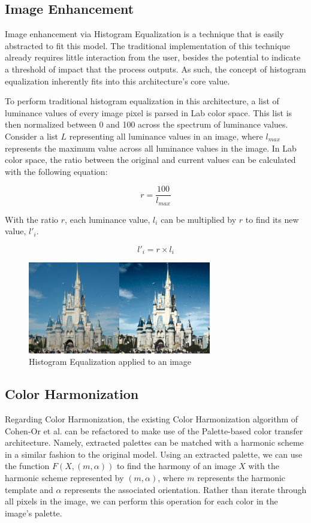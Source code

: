 \documentclass[sigchi]{acmart}
\begin{document}
\subsection{Image Enhancement}

Image enhancement via Histogram Equalization is a technique that is easily abstracted to fit this model. The traditional implementation of this technique already requires little interaction from the user, besides the potential to indicate a threshold of impact that the process outputs. As such, the concept of histogram equalization inherently fits into this architecture's core value.

To perform traditional histogram equalization in this architecture, a list of luminance values of every image pixel is parsed in Lab color space. This list is then normalized between 0 and 100 across the spectrum of luminance values. Consider a list \(L\) representing all luminance values in an image, where \(l_{max}\) represents the maximum value across all luminance values in the image. In Lab color space, the ratio between the original and current values can be calculated with the following equation:

\[r=\frac{100}{l_{max}}\]

With the ratio \(r\), each luminance value, \(l_i\) can be multiplied by \(r\) to find its new value, \(l'_i\).

\[l'_i=r \times l_i\]

\begin{figure}[t]
	\includegraphics[width=8cm]{CastleCompare}
	\caption{Histogram Equalization applied to an image}
\end{figure}

\subsection{Color Harmonization}

Regarding Color Harmonization, the existing Color Harmonization algorithm of Cohen-Or et al. can be refactored to make use of the Palette-based color transfer architecture. Namely, extracted palettes can be matched with a harmonic scheme in a similar fashion to the original model. Using an extracted palette, we can use the function \(F(X, (m,\alpha))\) to find the harmony of an image \(X\) with the harmonic scheme represented by \((m,\alpha)\), where \(m\) represents the harmonic template and \(\alpha\) represents the associated orientation. Rather than iterate through all pixels in the image, we can perform this operation for each color in the image's palette.
\end{document}
